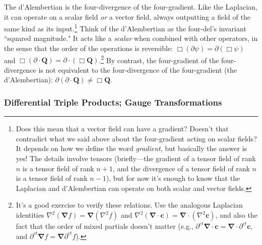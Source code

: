 \documentclass[12pt]{article}
\renewcommand{\vv}[1]{\mathbf{#1}}
\newcommand{\del}{\boldsymbol{\nabla}}
\begin{document}
The d'Alembertian is the four-divergence of the four-gradient. Like the Laplacian, it can operate on a scalar field \emph{or} a vector field, always outputting a field of the same kind as its input.\footnote{\label{fn:gd}Does this mean that a vector field can have a gradient? Doesn't that contradict what we said above about the four-gradient acting on scalar fields? It depends on how we define the word \emph{gradient}, but basically the answer is yes! The details involve tensors (briefly---the gradient of a tensor field of rank $n$ is a tensor field of rank $n + 1$, and the divergence of a tensor field of rank $n$ is a tensor field of rank $n - 1$), but for now it's enough to know that the Laplacian and d'Alembertian can operate on both scalar and vector fields.} Think of the d'Alembertian as the four-del's invariant ``squared magnitude." It acts like a \emph{scalar} when combined with other operators, in the sense that the order of the operations is reversible: $\Box (\partialup \psi) = \partialup (\Box \psi)$ and $\Box (\partialup \cdot \vv Q) = \partialup \cdot (\Box \vv Q)$.\footnote{It's a good exercise to verify these relations. Use the analogous Laplacian identities $\nabla ^2 (\del f) = \del (\nabla ^2 f)$ and $\nabla ^2 (\del \cdot \vv c) = \del \cdot (\nabla ^2 \vv c)$, and also the fact that the order of mixed partials doesn't matter (e.g., $\partial^{ct} \del \cdot \vv c = \del \cdot \partial^{ct} \vv c$, and $\partial^{ct} \del f = \del \partial^{ct} f$).} By contrast, the four-gradient of the four-divergence is not equivalent to the four-divergence of the four-gradient (the d'Alembertian): $\partialup (\partialup \cdot \vv Q) \neq \Box \vv Q$.


\subsubsection{Differential Triple Products; Gauge Transformations}\label{sssec:tp}
\end{document}
